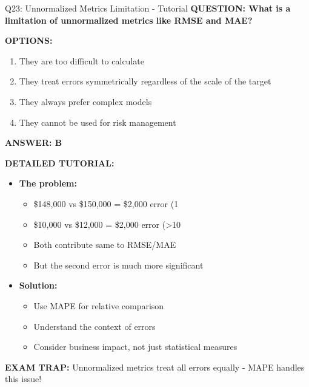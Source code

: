 \documentclass[8pt]{beamer}
\begin{document}
	\begin{frame}{Q23: Unnormalized Metrics Limitation - Tutorial}
		\fontsize{6.5}{7.5}\selectfont
		\textbf{QUESTION: What is a limitation of unnormalized metrics like RMSE and MAE?}
		
		\vspace{0.1cm}
		\textbf{OPTIONS:}
		\begin{enumerate}
			\item They are too difficult to calculate
			\item They treat errors symmetrically regardless of the scale of the target
			\item They always prefer complex models
			\item They cannot be used for risk management
		\end{enumerate}
		
		\vspace{0.1cm}
		\textcolor{myblue}{\textbf{ANSWER: B}}
		
		\vspace{0.1cm}
		\textbf{DETAILED TUTORIAL:}
		\begin{itemize}
			\item \textbf{The problem:}
			\begin{itemize}
				\item \$148,000 vs \$150,000 = \$2,000 error (1%
				\item \$10,000 vs \$12,000 = \$2,000 error (>10%
				\item Both contribute same to RMSE/MAE
				\item But the second error is much more significant
			\end{itemize}
			\item \textbf{Solution:}
			\begin{itemize}
				\item Use MAPE for relative comparison
				\item Understand the context of errors
				\item Consider business impact, not just statistical measures
			\end{itemize}
		\end{itemize}
		
		\textcolor{myred}{\textbf{EXAM TRAP:}} Unnormalized metrics treat \textcolor{myblue}{all errors equally} - MAPE handles this issue!
	\end{frame}
	
\end{document}
